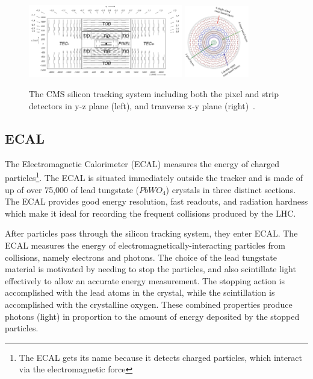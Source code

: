 \begin{figure}[hbtp]
 \begin{center}
   \includegraphics[width=0.6\textwidth]{ch3_figs/tracker_yz.pdf}
   \includegraphics[width=0.25\textwidth]{ch3_figs/tracker_transverse_layers.pdf}
   \caption[The CMS silicon tracking system]{The CMS silicon tracking system including both the pixel and strip detectors in y-z plane (left), and tranverse x-y plane (right)~\cite{cms_bluebook}.}
   \label{fig:cms_tracker}
 \end{center}
\end{figure}

\subsection{ECAL}
The Electromagnetic Calorimeter (ECAL) measures the energy of charged particles\footnote{The ECAL gets its name because it detects charged particles, which interact via the
electromagnetic force}. The ECAL is situated immediately outside the tracker
and is made of up of over 75,000 of lead tungstate ($PbWO_{4}$) crystals in three distinct sections. The ECAL provides good energy resolution, fast readouts, and radiation hardness
which make it ideal for recording the frequent collisions produced by the LHC. 

After particles pass through the silicon tracking system, they enter ECAL. The ECAL measures the energy of electromagnetically-interacting particles from collisions, namely electrons and photons.
The choice of the lead tungstate material is motivated by needing to stop the particles, and also scintillate light effectively to allow an accurate energy measurement.
The stopping action is accomplished with the lead atoms in the crystal, while the scintillation is accomplished with
the crystalline oxygen. These combined properties produce photons (light) in proportion to the amount of energy deposited by the stopped particles.

